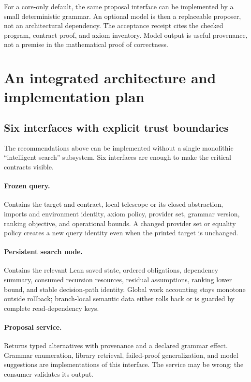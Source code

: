 \documentclass[11pt,a4paper]{article}
\theoremstyle{definition}
\theoremstyle{remark}
\begin{document}
For a core-only default, the same proposal interface can be implemented by a
small deterministic grammar. An optional model is then a replaceable proposer,
not an architectural dependency. The acceptance receipt cites the checked
program, contract proof, and axiom inventory. Model output is useful provenance,
not a premise in the mathematical proof of correctness.

\section{An integrated architecture and implementation plan}
\label{sec:architecture}

\subsection{Six interfaces with explicit trust boundaries}
The recommendations above can be implemented without a single monolithic
``intelligent search'' subsystem. Six interfaces are enough to make the critical
contracts visible.

\paragraph{Frozen query.}
Contains the target and contract, local telescope or its closed abstraction,
imports and environment identity, axiom policy, provider set, grammar version,
ranking objective, and operational bounds. A changed provider set or equality
policy creates a new query identity even when the printed target is unchanged.

\paragraph{Persistent search node.}
Contains the relevant Lean saved state, ordered obligations, dependency summary,
consumed recursion resources, residual assumptions, ranking lower bound, and
stable decision-path identity. Global work accounting stays monotone outside
rollback; branch-local semantic data either rolls back or is guarded by complete
read-dependency keys.

\paragraph{Proposal service.}
Returns typed alternatives with provenance and a declared grammar effect.
Grammar enumeration, library retrieval, failed-proof generalization, and model
suggestions are implementations of this interface. The service may be wrong;
the consumer validates its output.
\end{document}
